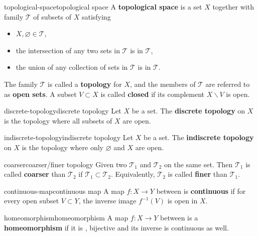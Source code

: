 \begin{topic}{topological-space}{topological space}
    A \textbf{topological space} is a set $X$ together with family $\mathcal{T}$ of subsets of $X$ satisfying
    \begin{itemize}
        \item $X, \varnothing \in \mathcal{T}$,
        \item the intersection of any two sets in $\mathcal{T}$ is in $\mathcal{T}$,
        \item the union of any collection of sets in $\mathcal{T}$ is in $\mathcal{T}$.
    \end{itemize}
    
    The family $\mathcal{T}$ is called a \textbf{topology} for $X$, and the members of $\mathcal{T}$ are referred to as \textbf{open sets}. A subset $V \subset X$ is called \textbf{closed} if its complement $X \backslash V$ is open.
\end{topic}

\begin{topic}{discrete-topology}{discrete topology}
    Let $X$ be a set. The \textbf{discrete topology} on $X$ is the topology where all subsets of $X$ are open.
\end{topic}

\begin{topic}{indiscrete-topology}{indiscrete topology}
    Let $X$ be a set. The \textbf{indiscrete topology} on $X$ is the topology where only $\varnothing$ and $X$ are open.
\end{topic}

\begin{topic}{coarser}{coarser/finer topology}
    Given two  $\mathcal{T}_1$ and $\mathcal{T}_2$ on the same set. Then $\mathcal{T}_1$ is called \textbf{coarser} than $\mathcal{T}_2$ if $\mathcal{T}_1 \subset \mathcal{T}_2$. Equivalently, $\mathcal{T}_2$ is called \textbf{finer} than $\mathcal{T}_1$.
\end{topic}

\begin{topic}{continuous-map}{continuous map}
    A map $f : X \to Y$ between  is \textbf{continuous} if for every open subset $V \subset Y$, the inverse image $f^{-1}(V)$ is open in $X$.
\end{topic}

\begin{topic}{homeomorphism}{homeomorphism}
    A map $f : X \to Y$ between  is a \textbf{homeomorphism} if it is , bijective and its inverse is continuous as well.
\end{topic}

